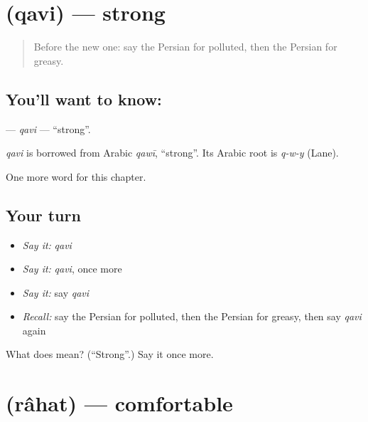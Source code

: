 \section[\texorpdfstring{\fa{قوی} (qavi)}{قوی (qavi)}]{ (qavi) — strong}

\label{lesson:FA-C199-qavi}



\begin{quote}
Before the new one: say the Persian for polluted, then the Persian for greasy.
\end{quote}

\subsection*{You'll want to know: }
\textbf{} — \emph{qavi} — \textquotedblleft{}strong\textquotedblright{}.

\begin{cousinweb}
\emph{qavi} is borrowed from Arabic \emph{qawī}, \textquotedblleft{}strong\textquotedblright{}. Its Arabic root is \emph{q-w-y} (Lane).
\end{cousinweb}

\begin{grammarlens}[title={What you've built}]
One more word for this chapter.
\end{grammarlens}

\subsection*{Your turn}
\begin{itemize}
\raggedright
  \item \emph{Say it:} \emph{qavi}
  \item \emph{Say it:} \emph{qavi}, once more
  \item \emph{Say it:} say \emph{qavi}
  \item \emph{Recall:} say the Persian for polluted, then the Persian for greasy, then say \emph{qavi} again
\end{itemize}

\begin{tcolorbox}[breakable,colback=teal!4,colframe=teal!35!black,title={Before you move on}]
What does  mean? (\textquotedblleft{}Strong\textquotedblright{}.) Say it once more.
\end{tcolorbox}
\section[\texorpdfstring{\fa{راحت} (râhat)}{راحت (râhat)}]{ (râhat) — comfortable}


